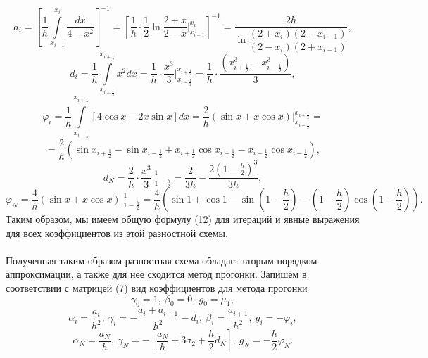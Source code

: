 \documentclass[a4paper, 12pt]{article}
\begin{document}
    $$a_i = \left[ \dfrac 1h \int\limits_{x_{i-1}}^{x_i} \dfrac{dx}{4-x^2}\right]^{-1} = \left[ \dfrac 1h\cdot \dfrac 12 \ln \dfrac{2+x}{2-x}\Big|_{x_{i-1}}^{x_i}\right]^{-1} = \dfrac{2h}{\ln \dfrac{(2+x_i)(2-x_{i-1})}{(2-x_i)(2+x_{i-1})}},$$
    $$d_i=\dfrac 1h \int\limits_{x_{i-\frac12}}^{x_{i+\frac12}} x^2 dx = \dfrac 1 h\cdot \dfrac {x^3}{3}\Big | _{x_{i-\frac12}}^{x_{i+\frac12}}=\dfrac 1h\cdot \dfrac{(x_{i+\frac12}^3 - x_{i - \frac 12}^3)}{3},$$
    $$\varphi_i = \dfrac{1}{h} \int\limits_{x_{i-\frac12}}^{x_{i+\frac12}}[4\cos x - 2 x \sin x]dx = \dfrac 2 h (\sin x  + x \cos x)\Big | _{x_{i-\frac12}}^{x_{i+\frac12}}=$$ $$= \dfrac 2 h (\sin x_{i+\frac 12} - \sin x_{i-\frac 12} + x_{i+\frac 12}\cos x_{i+\frac 12} - x_{i-\frac 12}\cos x_{i-\frac 12}),$$
    $$d_N = \dfrac 2 h\cdot \dfrac {x^3}{3}\Big | _{1-\frac h 2}^{1} = \dfrac {2}{3h} - \dfrac{2 \left(1 - \frac h2\right)^3}{3h},$$ $$\varphi_N = \dfrac 4 h (\sin x  + x \cos x)\Big | _{1-\frac h2}^{1} = \dfrac 4 h \left(\sin 1 + \cos 1 - \sin \left(1-\dfrac h 2\right)- \left(1-\dfrac h 2\right) \cos \left(1-\dfrac h 2\right)\right).$$
    Таким образом, мы имеем общую формулу (12) для итераций и явные выражения для всех коэффициентов из этой разностной схемы. \\\\
    Полученная таким образом разностная схема обладает вторым порядком аппроксимации, а также для нее сходится метод прогонки.
    Запишем в соответствии с матрицей (7) вид коэффициентов для метода прогонки
    $$\gamma_0 = 1,\ \beta_0 = 0,\ g_0 = \mu_1,$$
    $$\alpha_i = \dfrac{a_i}{h^2},\ \gamma_i = -\dfrac{a_{i} + a_{i+1}}{h^2} - d_i, \ \beta_i =\dfrac{a_{i+1}}{h^2},\ g_i = -\varphi_i,$$
    $$\alpha_N = \dfrac{a_N} h,\ \gamma_N = -\left[\dfrac{a_N}{h} + 3\sigma_2 + \dfrac h2 d_N\right],\ g_N = - \dfrac h 2 \varphi_N.$$
\end{document}
